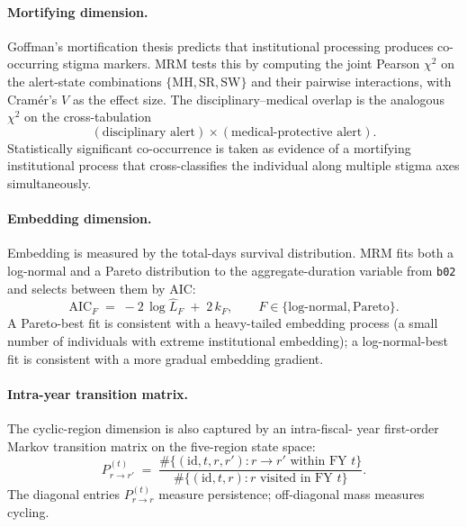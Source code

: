 \documentclass[11pt,a4paper]{article}
\theoremstyle{plain}
\theoremstyle{definition}
\theoremstyle{remark}
\begin{document}
\paragraph{Mortifying dimension.}
Goffman's mortification thesis predicts that institutional
processing produces co-occurring stigma markers. MRM tests this
by computing the joint Pearson $\chi^{2}$ on the alert-state
combinations $\{\mathrm{MH}, \mathrm{SR}, \mathrm{SW}\}$ and
their pairwise interactions, with Cram\'{e}r's $V$ as the effect
size. The disciplinary--medical overlap is the analogous
$\chi^{2}$ on the cross-tabulation
\[
  (\text{disciplinary alert}) \times (\text{medical-protective alert}).
\]
Statistically significant co-occurrence is taken as evidence of
a mortifying institutional process that cross-classifies the
individual along multiple stigma axes simultaneously.

\paragraph{Embedding dimension.}
Embedding is measured by the total-days survival distribution.
MRM fits both a log-normal and a Pareto distribution to the
aggregate-duration variable from \texttt{b02} and selects between
them by AIC:
\begin{equation}
  \mathrm{AIC}_{F}
  \;=\; -2\, \log\hat{L}_{F}
   \;+\; 2\, k_{F},
   \qquad F \in \{\text{log-normal}, \text{Pareto}\}.
  \label{eq:embedding-aic}
\end{equation}
A Pareto-best fit is consistent with a heavy-tailed embedding
process (a small number of individuals with extreme institutional
embedding); a log-normal-best fit is consistent with a more
gradual embedding gradient.

\paragraph{Intra-year transition matrix.}
The cyclic-region dimension is also captured by an intra-fiscal-
year first-order Markov transition matrix on the
five-region state space:
\begin{equation}
  P^{(t)}_{r \to r'}
  \;=\;
  \frac{\#\{(\mathrm{id}, t, r, r') :
              r \to r' \text{ within FY } t\}}
       {\#\{(\mathrm{id}, t, r) :
              r \text{ visited in FY } t\}}.
  \label{eq:transition-matrix}
\end{equation}
The diagonal entries $P^{(t)}_{r \to r}$ measure persistence;
off-diagonal mass measures cycling.
\end{document}
